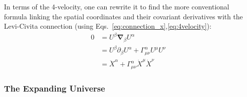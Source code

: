 In terms of the 4-velocity, one can rewrite it to find the more conventional formula linking the spatial coordinates and their covariant derivatives with the Levi-Civita connection (using Eqs.~\ref{eq:connection_x},\ref{eq:4velocity}):
\begin{equation}
\label{eq:geodesic_u}
\begin{array}{cl}
0 &= U^{\beta} \pmb{\nabla}_{\beta} U^{\alpha}\\
&= U^\beta \partial_\beta U^\alpha + \Gamma^{\alpha}_{\mu \nu} U^\mu U^\nu\\
&= \ddot{X}^\alpha + \Gamma^{\alpha}_{\mu \nu} \dot{X}^\mu \dot{X}^\nu
\end{array}
\end{equation}

\subsubsection{The Expanding Universe}

